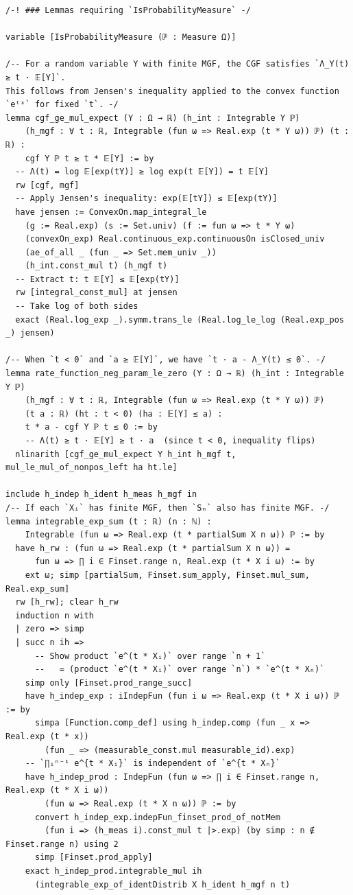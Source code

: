 \newpage
\begin{lstlisting}
/-! ### Lemmas requiring `IsProbabilityMeasure` -/

variable [IsProbabilityMeasure (ℙ : Measure Ω)]

/-- For a random variable Y with finite MGF, the CGF satisfies `Λ_Y(t) ≥ t · 𝔼[Y]`.
This follows from Jensen's inequality applied to the convex function `eᵗˣ` for fixed `t`. -/
lemma cgf_ge_mul_expect (Y : Ω → ℝ) (h_int : Integrable Y ℙ)
    (h_mgf : ∀ t : ℝ, Integrable (fun ω => Real.exp (t * Y ω)) ℙ) (t : ℝ) :
    cgf Y ℙ t ≥ t * 𝔼[Y] := by
  -- Λ(t) = log 𝔼[exp(tY)] ≥ log exp(t 𝔼[Y]) = t 𝔼[Y]
  rw [cgf, mgf]
  -- Apply Jensen's inequality: exp(𝔼[tY]) ≤ 𝔼[exp(tY)]
  have jensen := ConvexOn.map_integral_le
    (g := Real.exp) (s := Set.univ) (f := fun ω => t * Y ω)
    (convexOn_exp) Real.continuous_exp.continuousOn isClosed_univ
    (ae_of_all _ (fun _ => Set.mem_univ _))
    (h_int.const_mul t) (h_mgf t)
  -- Extract t: t 𝔼[Y] ≤ 𝔼[exp(tY)]
  rw [integral_const_mul] at jensen
  -- Take log of both sides
  exact (Real.log_exp _).symm.trans_le (Real.log_le_log (Real.exp_pos _) jensen)

/-- When `t < 0` and `a ≥ 𝔼[Y]`, we have `t · a - Λ_Y(t) ≤ 0`. -/
lemma rate_function_neg_param_le_zero (Y : Ω → ℝ) (h_int : Integrable Y ℙ)
    (h_mgf : ∀ t : ℝ, Integrable (fun ω => Real.exp (t * Y ω)) ℙ)
    (t a : ℝ) (ht : t < 0) (ha : 𝔼[Y] ≤ a) :
    t * a - cgf Y ℙ t ≤ 0 := by
    -- Λ(t) ≥ t · 𝔼[Y] ≥ t · a  (since t < 0, inequality flips)
  nlinarith [cgf_ge_mul_expect Y h_int h_mgf t, mul_le_mul_of_nonpos_left ha ht.le]

include h_indep h_ident h_meas h_mgf in
/-- If each `Xᵢ` has finite MGF, then `Sₙ` also has finite MGF. -/
lemma integrable_exp_sum (t : ℝ) (n : ℕ) :
    Integrable (fun ω => Real.exp (t * partialSum X n ω)) ℙ := by
  have h_rw : (fun ω => Real.exp (t * partialSum X n ω)) =
      fun ω => ∏ i ∈ Finset.range n, Real.exp (t * X i ω) := by
    ext ω; simp [partialSum, Finset.sum_apply, Finset.mul_sum, Real.exp_sum]
  rw [h_rw]; clear h_rw
  induction n with
  | zero => simp
  | succ n ih =>
      -- Show product `e^(t * Xᵢ)` over range `n + 1`
      --   = (product `e^(t * Xᵢ)` over range `n`) * `e^(t * Xₙ)`
    simp only [Finset.prod_range_succ]
    have h_indep_exp : iIndepFun (fun i ω => Real.exp (t * X i ω)) ℙ := by
      simpa [Function.comp_def] using h_indep.comp (fun _ x => Real.exp (t * x))
        (fun _ => (measurable_const.mul measurable_id).exp)
    -- `∏ᵢⁿ⁻¹ e^{t * Xᵢ}` is independent of `e^{t * Xₙ}`
    have h_indep_prod : IndepFun (fun ω => ∏ i ∈ Finset.range n, Real.exp (t * X i ω))
        (fun ω => Real.exp (t * X n ω)) ℙ := by
      convert h_indep_exp.indepFun_finset_prod_of_notMem
        (fun i => (h_meas i).const_mul t |>.exp) (by simp : n ∉ Finset.range n) using 2
      simp [Finset.prod_apply]
    exact h_indep_prod.integrable_mul ih
      (integrable_exp_of_identDistrib X h_ident h_mgf n t)
\end{lstlisting}
